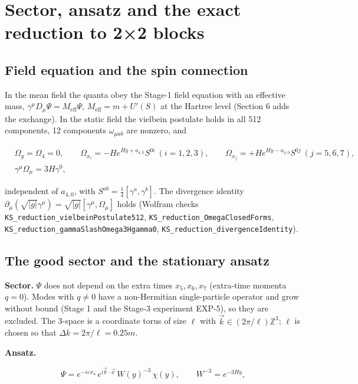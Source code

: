 \documentclass[11pt]{article}
\begin{document}
\section{Sector, ansatz and the exact reduction to 2×2 blocks}

\subsection{Field equation and the spin connection}

In the mean field the quanta obey the Stage-1 field equation with an effective mass, $\gamma^\mu D_\mu\Psi=M_{\mathrm{eff}}\Psi$, $M_{\mathrm{eff}}=m+U'(S)$ at the Hartree level (Section 6 adds the exchange). In the static field the vielbein postulate holds in all 512 components, 12 components $\omega_{\mu ab}$ are nonzero, and

\[
\begin{aligned}
&\Omega_y=\Omega_4=0,\qquad \Omega_{x_i}=-He^{Hy+a_{4,0}}S^{0i}\ (i=1,2,3),\qquad \Omega_{x_j}=+He^{Hy-a_{4,0}}S^{0j}\ (j=5,6,7),\\
&\gamma^\mu\Omega_\mu=3H\gamma^0 ,
\end{aligned}
\]

independent of $a_{4,0}$, with $S^{ab}=\tfrac14[\gamma^a,\gamma^b]$. The divergence identity $\partial_\mu(\sqrt{|g|}\gamma^\mu)=\sqrt{|g|}[\gamma^\mu,\Omega_\mu]$ holds (Wolfram checks \texttt{KS\_reduc\allowbreak{}tion\_vie\allowbreak{}lbeinPos\allowbreak{}tulate51\allowbreak{}2}, \texttt{KS\_reduc\allowbreak{}tion\_Ome\allowbreak{}gaClosed\allowbreak{}Forms}, \texttt{KS\_reduc\allowbreak{}tion\_gam\allowbreak{}maSlashO\allowbreak{}mega3Hga\allowbreak{}mma0}, \texttt{KS\_reduc\allowbreak{}tion\_div\allowbreak{}ergenceI\allowbreak{}dentity}).

\subsection{The good sector and the stationary ansatz}

\textbf{Sector.} $\Psi$ does not depend on the extra times $x_5,x_6,x_7$ (extra-time momenta $q=0$). Modes with $q\ne0$ have a non-Hermitian single-particle operator and grow without bound (Stage 1 and the Stage-3 experiment EXP-5), so they are excluded. The 3-space is a coordinate torus of size $\ell$ with $\vec k\in(2\pi/\ell)\mathbb Z^3$; $\ell$ is chosen so that $\Delta k=2\pi/\ell=0.25m$.

\textbf{Ansatz.}

\[
\Psi=e^{-i\varepsilon x_4}\,e^{i\vec k\cdot\vec x}\,W(y)^{-3}\,\chi(y),\qquad W^{-3}=e^{-3Hy},
\]
\end{document}
